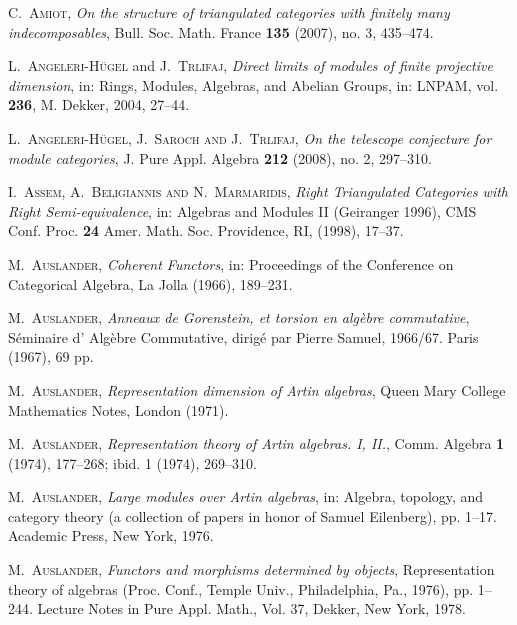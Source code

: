 \documentclass[oneside, a4paper,reqno]{amsart}
\numberwithin{equation}{section}
\theoremstyle{definition}
\begin{document}
\begin{thebibliography}{99}

\textsc{C.~Amiot}, \textit{On the structure of triangulated categories
with finitely many indecomposables},  Bull. Soc. Math. France {\bf
135} (2007),  no. 3, 435--474.

\textsc{L.~Angeleri-H\"{u}gel} and \textsc{J.~Trlifaj}, \textit{Direct limits of modules of
finite projective dimension}, in: Rings, Modules, Algebras, and
Abelian Groups, in: LNPAM, vol. {\bf 236}, M. Dekker, 2004, 27--44.

\textsc{L.~Angeleri-H\"{u}gel, J.~Saroch and J.~Trlifaj}, \textit{On
the telescope conjecture for module categories},  J. Pure Appl.
Algebra {\bf 212} (2008), no. 2, 297--310.

\textsc{I.~Assem, A.~Beligiannis and  N.~Marmaridis}, \textit{Right
Triangulated Categories with Right Semi-equivalence}, in: Algebras
and Modules II (Geiranger 1996), CMS Conf. Proc. {\bf 24} Amer.
Math. Soc. Providence, RI,  (1998), 17--37.

\textsc{M.~Auslander},
 \textit{Coherent Functors}, in: Proceedings
of the Conference on Categorical Algebra, La Jolla (1966), 189--231.

\textsc{M.~Auslander}, {\em Anneaux de Gorenstein, et torsion en alg\`{e}bre
commutative}, S\'{e}minaire d' Alg\`{e}bre Commutative, dirig\'{e} par
Pierre Samuel, 1966/67. Paris (1967), 69 pp.

\textsc{M.~Auslander}, \textit{Representation dimension of Artin algebras},  Queen
Mary College Mathematics Notes, London (1971).

\textsc{M.~Auslander}, \textit{Representation theory of Artin algebras. I, II.},
Comm. Algebra  {\bf 1} (1974), 177--268; ibid. 1 (1974), 269--310.

\textsc{M.~Auslander}, \textit{Large modules over Artin algebras}, in: Algebra, topology,
and category theory (a collection of papers in honor of Samuel
Eilenberg),  pp. 1--17. Academic Press, New York, 1976.

\textsc{M.~Auslander}, \textit{Functors and morphisms determined by objects},
 Representation theory of algebras (Proc. Conf., Temple Univ., Philadelphia, Pa., 1976),  pp. 1--244.
 Lecture Notes in Pure Appl. Math., Vol. 37, Dekker, New York, 1978.


\end{thebibliography}
\end{document}
